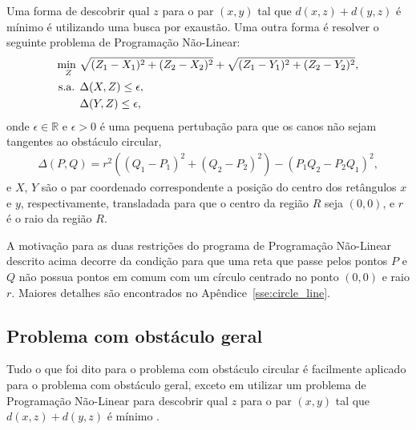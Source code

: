 Uma forma de descobrir qual $z$ para o par $(x, y)$ tal que $d(x, z) + d(y, z)$
é mínimo é utilizando uma busca por exaustão. Uma outra forma é resolver o
seguinte problema de Programação Não-Linear:
\begin{align}
    \underset{Z}{\text{min }} & \sqrt{(Z_1 - X_1)^2 + (Z_2 - X_2)^2} +
    \sqrt{(Z_1 - Y_1)^2 + (Z_2 - Y_2)^2}, \notag \\
    \text{s.a. } & \Delta(X, Z) \leq \epsilon, \label{eq:pnl_aux} \\
    & \Delta(Y, Z) \leq \epsilon, \notag
\end{align}
onde $\epsilon \in \mathbb{R}$ e $\epsilon > 0$ é uma pequena pertubação para
que os canos não sejam tangentes ao obstáculo circular,
\begin{align*}
    \Delta(P, Q) = r^2 \left( (Q_1 - P_1)^2 + (Q_2 - P_2)^2 \right) - \left(
    P_1 Q_2 - P_2 Q_1 \right)^2,
\end{align*}
e $X$, $Y$ são o par coordenado correspondente a posição do centro dos
retângulos $x$ e $y$, respectivamente, transladada para que o centro da região
$R$ seja $(0, 0)$, e $r$ é o raio da região $R$.

A motivação para as duas restrições do programa de Programação Não-Linear
descrito acima decorre da condição para que uma reta que passe pelos pontos $P$
e $Q$ não possua pontos em comum com um círculo centrado no ponto $(0, 0)$ e
raio $r$. Maiores detalhes são encontrados no Apêndice~\ref{sse:circle_line}.

\subsection{Problema com obst\'{a}culo geral}
Tudo o que foi dito para o problema com obst\'{a}culo circular \'{e} facilmente
aplicado para o problema com obst\'{a}culo geral, exceto em utilizar um problema
de Programação Não-Linear para descobrir qual $z$ para o par $(x, y)$ tal que
$d(x, z) + d(y, z)$ é mínimo .
